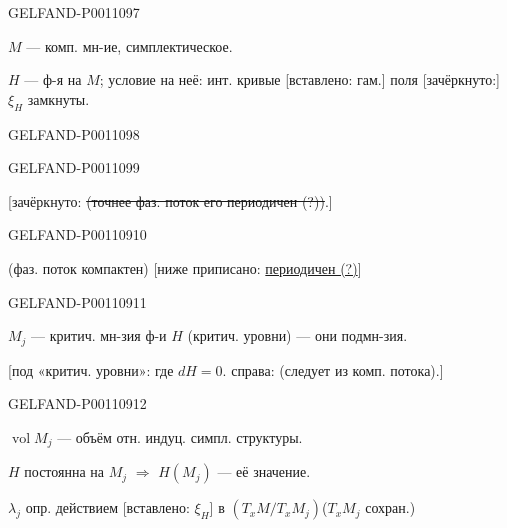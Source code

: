 \begin{GelfandAdjacentEvidence}{GELFAND-P001109}{7}


$M$ — комп. мн-ие, симплектическое.

$H$ — ф-я на $M$; условие на неё: инт. кривые
[вставлено: гам.] поля [зачёркнуто:] $\xi_H$ замкнуты.
\end{GelfandAdjacentEvidence}
\begin{GelfandAdjacentEvidence}{GELFAND-P001109}{8}

\end{GelfandAdjacentEvidence}
\begin{GelfandAdjacentEvidence}{GELFAND-P001109}{9}


[зачёркнуто: \sout{(точнее фаз. поток его периодичен (?))}.]
\end{GelfandAdjacentEvidence}
\begin{GelfandAdjacentEvidence}{GELFAND-P001109}{10}


(фаз. поток компактен)
[ниже приписано: \underline{периодичен (?)}]
\end{GelfandAdjacentEvidence}
\begin{GelfandAdjacentEvidence}{GELFAND-P001109}{11}


$M_j$ — критич. мн-зия ф-и $H$ (критич. уровни) — они подмн-зия.

[под «критич. уровни»: где $dH=0$. справа: (следует из комп. потока).]
\end{GelfandAdjacentEvidence}
\begin{GelfandAdjacentEvidence}{GELFAND-P001109}{12}


$\operatorname{vol} M_j$ — объём отн. индуц. симпл. структуры.

$H$ постоянна на $M_j$ $\Rightarrow$ $H(M_j)$ — её значение.

$\lambda_j$ опр. действием [вставлено: $\xi_H$] в
$\left(T_xM/T_xM_j\right)$\qquad($T_xM_j$ сохран.)
\end{GelfandAdjacentEvidence}
